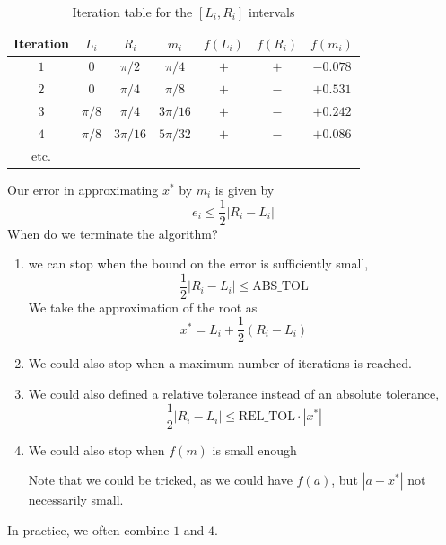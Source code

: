 \begin{example}
    \begin{table}[H]
        \centering
        \begin{tabular}{c|c|c|c|c|c|c}
            Iteration & \( L_i \)    & \( R_i \)    & \( m_i \)
                      & \( f(L_i) \) & \( f(R_i) \) & \( f(m_i) \) \\ \hline
            \(1\)     & \(0\)        & \(\pi/2\)    & \(\pi/4\)
                      & \(+\)        & \(+\)        & \( -0.078 \) \\
            \(2\)     & \(0\)        & \(\pi/4\)    & \(\pi/8\)
                      & \(+\)        & \(-\)        & \( +0.531 \) \\
            \(3\)     & \(\pi/8\)    & \(\pi/4\)    & \(3\pi/16\)
                      & \(+\)        & \(-\)        & \( +0.242 \) \\
            \(4\)     & \(\pi/8\)    & \(3\pi/16\)  & \(5\pi/32\)
                      & \(+\)        & \(-\)        & \( +0.086 \) \\
            etc.
        \end{tabular}
        \caption{Iteration table for the \( [L_i, R_i] \) intervals}
    \end{table}
    Our error in approximating \( x^\ast \) by \( m_i \) is given by \[
        e_i \leq \frac{1}{2} | R_i - L_i |
    \]
    When do we terminate the algorithm?

    \begin{enumerate}
        \item we can stop when the bound on the error is sufficiently small, \[
                  \frac{1}{2} | R_i - L_i | \leq \text{ABS\_TOL}
              \] We take the approximation of the root as \[
                  x^\ast = L_i + \frac{1}{2} (R_i - L_i)
              \]
        \item We could also stop when a maximum number of iterations is reached.
        \item We could also defined a relative tolerance instead of an absolute tolerance, \[
                  \frac{1}{2} | R_i - L_i | \leq \text{REL\_TOL} \cdot | x^\ast |
              \]
        \item We could also stop when \( f(m) \) is small enough

              Note that we could be tricked, as we could have \( f(a) \), but \( | a - x^\ast | \) not necessarily small.
    \end{enumerate}

    In practice, we often combine \( 1 \) and \( 4 \).
\end{example}

